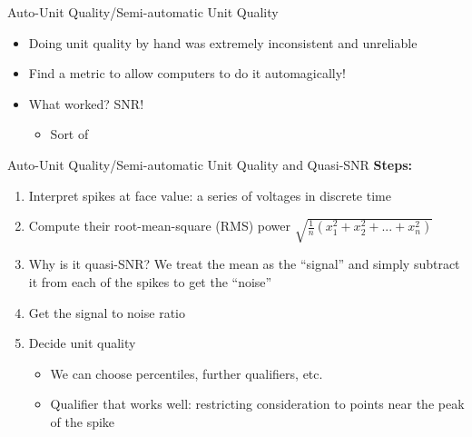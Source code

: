 \documentclass[11pt,handout]{beamer}
\begin{document}
    \begin{frame}{Auto-Unit Quality/Semi-automatic Unit Quality}
        \begin{itemize}
            \pause
            \item Doing unit quality by hand was extremely inconsistent and
unreliable
            \pause
            \item Find a metric to allow computers to do it automagically!
            \pause
            \item What worked? SNR!
            \pause
                \begin{itemize}
                    \item Sort of
                \end{itemize}
            \end{itemize}
    \end{frame}
    
    \begin{frame}{Auto-Unit Quality/Semi-automatic Unit Quality and Quasi-SNR}
        \textbf{Steps: }
        \begin{enumerate}
            \item Interpret spikes at face value: a series of voltages in
discrete time
            \pause
            \item Compute their root-mean-square (RMS) power
            \pause
            \ensuremath{\sqrt{\frac{1}{n}\left(x^2_1 + x^2_2 + ... +
x^2_n\right)}}
            \pause
            \item Why is it quasi-SNR? We treat the mean as the ``signal'' and
simply subtract it from each of the spikes to get the ``noise''
            \pause
            \item Get the signal to noise ratio
            \pause
            \item Decide unit quality
            \begin{itemize}
                \item We can choose percentiles, further qualifiers, etc.
                \pause
                \item Qualifier that works well: restricting consideration to
points near the peak of the spike
            \end{itemize}
        \end{enumerate}
    \end{frame}
\end{document}
